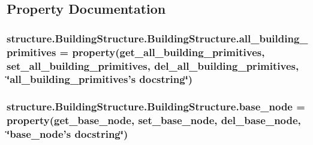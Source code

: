 \subsection{Property Documentation}
\hypertarget{classstructure_1_1_building_structure_1_1_building_structure_aed1a46fc5b79e8b7634cbe2fbe3feea7}{
\subsubsection[{all\-\_\-building\-\_\-primitives}]{\setlength{\rightskip}{0pt plus 5cm}structure.\-Building\-Structure.\-Building\-Structure.\-all\-\_\-building\-\_\-primitives = property({\bf get\-\_\-all\-\_\-building\-\_\-primitives}, {\bf set\-\_\-all\-\_\-building\-\_\-primitives}, {\bf del\-\_\-all\-\_\-building\-\_\-primitives}, \char`\"{}all\-\_\-building\-\_\-primitives's docstring\char`\"{})\hspace{0.3cm}{\ttfamily [static]}}}\label{classstructure_1_1_building_structure_1_1_building_structure_aed1a46fc5b79e8b7634cbe2fbe3feea7}
\hypertarget{classstructure_1_1_building_structure_1_1_building_structure_a18075785b5c4524f6731c1fda15c7730}{
\subsubsection[{base\-\_\-node}]{\setlength{\rightskip}{0pt plus 5cm}structure.\-Building\-Structure.\-Building\-Structure.\-base\-\_\-node = property({\bf get\-\_\-base\-\_\-node}, {\bf set\-\_\-base\-\_\-node}, {\bf del\-\_\-base\-\_\-node}, \char`\"{}base\-\_\-node's docstring\char`\"{})\hspace{0.3cm}{\ttfamily [static]}}}\label{classstructure_1_1_building_structure_1_1_building_structure_a18075785b5c4524f6731c1fda15c7730}
